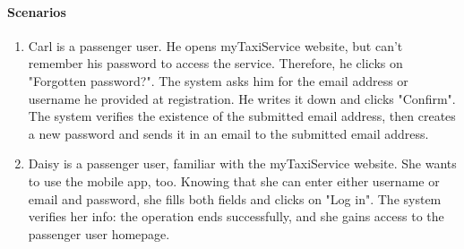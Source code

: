 	\paragraph{Scenarios}
		\begin{enumerate}
			\item Carl is a passenger user. He opens myTaxiService website, but can't remember his password to access the service. Therefore, he clicks on "Forgotten password?". The system asks him for the email address or username he provided at registration. He writes it down and clicks "Confirm". The system verifies the existence of the submitted email address, then creates a new password and sends it in an email to the submitted email address.
			
			\item Daisy is a passenger user, familiar with the myTaxiService website. She wants to use the mobile app, too. Knowing that she can enter either username or email and password, she fills both fields and clicks on "Log in". The system verifies her info: the operation ends successfully, and she gains access to the passenger user homepage.
		\end{enumerate}

